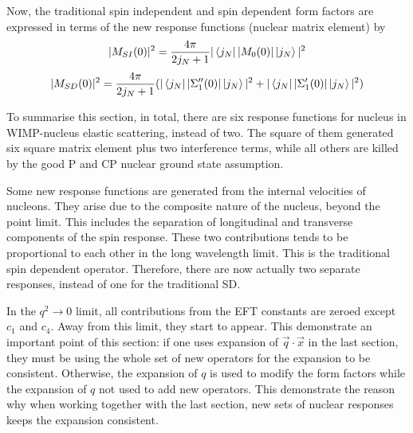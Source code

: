 \documentclass[12pt]{article}
\begin{document}
Now, the traditional spin independent and spin dependent form factors are expressed in terms of the new response functions (nuclear matrix element) by
$$
|M_{SI}(0) |^2= \frac{4\pi}{2j_N+1} | \bra{j_N} | M_0(0) | \ket{j_N}| ^2
$$
$$
|M_{SD}(0)|^2 = \frac{4\pi}{2j_N+1}( | \bra{j_N} | \Sigma_1''(0) | \ket{j_N}| ^2+ | \bra{j_N} | \Sigma_1'(0) | \ket{j_N}| ^2)
$$

To summarise this section, in total, there are six response functions for nucleus in WIMP-nucleus elastic scattering, instead of two. The square of them generated six square matrix element plus two interference terms, while all others are killed by the good P and CP nuclear ground state assumption. 


Some new response functions are generated from the internal velocities of nucleons. They arise due to the composite nature of the nucleus, beyond the point limit. 
This includes the separation of longitudinal and transverse components of the spin response. These two contributions tends to be proportional to each other in the long wavelength limit. This is the traditional spin dependent operator. Therefore, there are now actually two separate responses, instead of one for the traditional SD. 

In the $ q^2 \rightarrow 0$ limit, all contributions from the EFT constants are zeroed except $c_1$ and $c_4$. Away from this limit, they start to appear. This demonstrate an important point of this section: if one uses expansion of $\vec q \cdot \vec x$ in the last section, they must be using the whole set of new operators for the expansion to be consistent. Otherwise, the expansion of $q$ is used to modify the form factors while the expansion of $q$ not used to add new operators. This demonstrate the reason why when working together with the last section, new sets of nuclear responses keeps the expansion consistent. 
\end{document}
